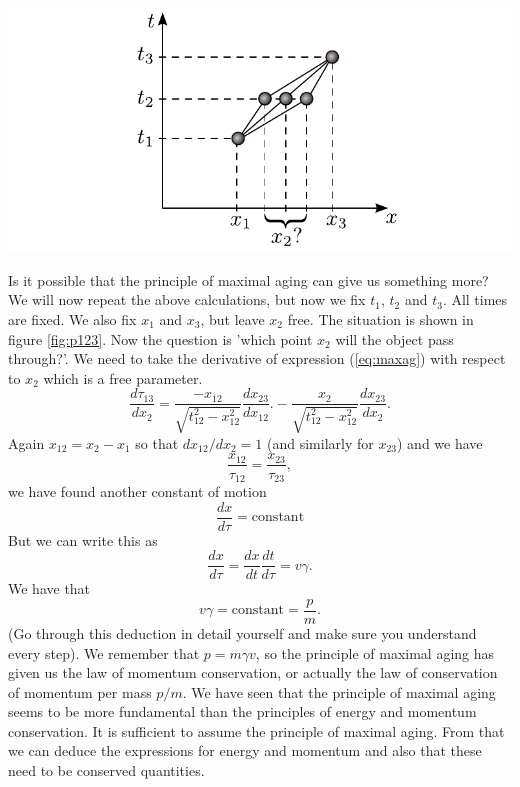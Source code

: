 {\begin{multicols}{2}
\begin{Figure}
\centering
\includegraphics[width=\textwidth]{fig_15-4.pdf}
\end{Figure}


Is it possible that the principle of maximal aging can give us something more? We will now repeat the above calculations, but now we fix $t_{1}$, $t_{2}$ and $t_{3}$. All times are fixed. We also fix $x_1$ and $x_3$, but leave $x_2$ free. The situation is shown in figure \ref{fig:p123}. Now the question is 'which point $x_2$ will the object pass through?'. We need to take the derivative of expression (\ref{eq:maxag}) with respect to $x_{2}$ which is a free parameter.
\[
\frac{d\tau_{13}}{dx_{2}}=\frac{-x_{12}}{\sqrt{t_{12}^2-x_{12}^2}}\frac{dx_{23}}{dx_{12}}.-\frac{x_{2}}{\sqrt{t_{12}^2-x_{12}^2}}\frac{dx_{23}}{dx_{2}}.
\]
Again $x_{12}=x_{2}-x_{1}$ so that $dx_{12}/dx_{2}=1$ (and similarly for $x_{23}$) and we have
\[
\frac{x_{12}}{\tau_{12}}=\frac{x_{23}}{\tau_{23}},
\]
we have found another constant of motion
\[
\frac{dx}{d\tau}=\mathrm{constant}
\]
But we can write this as
\[
\frac{dx}{d\tau}=\frac{dx}{dt}\frac{dt}{d\tau}=v\gamma.
\]
We have that
\[
v\gamma=\mathrm{constant}=\frac{p}{m}.
\]
(Go through this deduction in detail yourself and make sure you understand every step). We remember that $p=m\gamma v$, so the principle of maximal aging has given us the law of momentum conservation, or actually the law of conservation of momentum per mass $p/m$. We have seen that the principle of maximal aging seems to be more fundamental than the principles of energy and momentum conservation. It is sufficient to assume the principle of maximal aging. From that we can deduce the expressions for energy and momentum and also that these need to be conserved quantities.



\end{multicols}}
